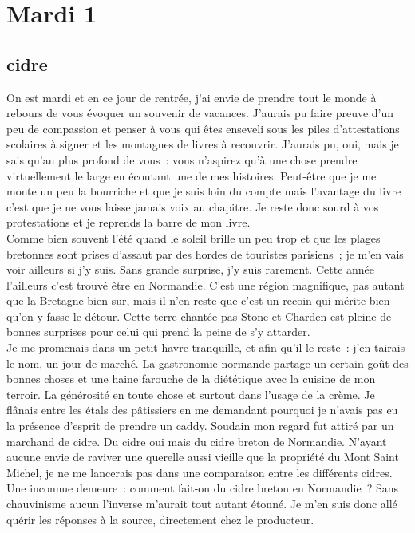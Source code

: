 ﻿\section*{Mardi 1}
\subsection{cidre}

On est mardi et en ce jour de rentrée, j’ai envie de prendre tout le monde à rebours de vous évoquer un souvenir de vacances. J’aurais pu faire preuve d’un peu de compassion et penser à vous qui êtes enseveli sous les piles d’attestations scolaires à signer et les montagnes de livres à recouvrir. J’aurais pu, oui, mais je sais qu’au plus profond de vous : vous n’aspirez qu’à une chose prendre virtuellement le large en écoutant une de mes histoires.
Peut-être que je me monte un peu la bourriche et que je suis loin du compte mais l’avantage du livre c’est que je ne vous laisse jamais voix au chapitre. Je reste donc sourd à vos protestations et je reprends la barre de mon livre. \\

Comme bien souvent l’été quand le soleil brille un peu trop et que les plages bretonnes sont prises d’assaut par des hordes de touristes parisiens ; je m’en vais voir ailleurs si j’y suis. Sans grande surprise, j’y suis rarement. Cette année l’ailleurs c’est trouvé être en Normandie. C’est une région magnifique, pas autant que la Bretagne bien sur, mais il n’en reste que c’est un recoin qui mérite bien qu’on y fasse le détour. Cette terre chantée pas Stone et Charden est pleine de bonnes surprises pour celui qui prend la peine de s’y attarder.\\

Je me promenais dans un petit havre tranquille, et afin qu’il le reste : j’en tairais le nom, un jour de marché. La gastronomie normande partage un certain goût des bonnes choses et une haine farouche de la diététique avec la cuisine de mon terroir. La générosité en toute chose et surtout dans l’usage de la crème. Je flânais entre les étals des pâtissiers en me demandant pourquoi je n’avais pas eu la présence d’esprit de prendre un caddy. Soudain mon regard fut attiré par un marchand de cidre. Du cidre oui mais du cidre breton de Normandie. N’ayant aucune envie de raviver une querelle aussi vieille que la propriété du Mont Saint Michel, je ne me lancerais pas dans une comparaison entre les différents cidres. Une inconnue demeure : comment fait-on du cidre breton en Normandie ? Sans chauvinisme aucun l’inverse m’aurait tout autant étonné. 
Je m’en suis donc allé quérir les réponses à la source, directement chez le producteur.\\

